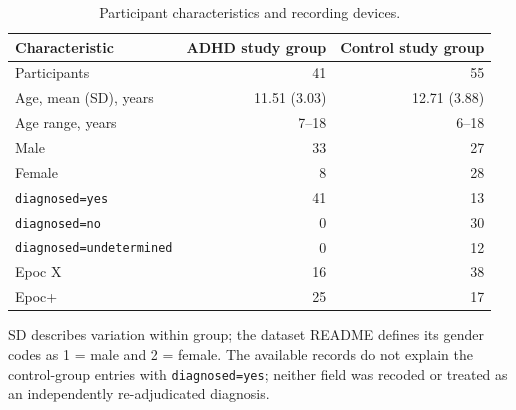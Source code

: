 \begin{table}[!htbp]
\centering\small
\caption{Participant characteristics and recording devices.}
\label{tab:participants}
\setlength{\tabcolsep}{5pt}\renewcommand{\arraystretch}{1.14}
\begin{tabularx}{\textwidth}{@{}>{\raggedright\arraybackslash}Xrr@{}}
\toprule
Characteristic & ADHD study group & Control study group\\\midrule
Participants & 41 & 55\\
Age, mean (SD), years & 11.51 (3.03) & 12.71 (3.88)\\
Age range, years & 7--18 & 6--18\\
Male & 33 & 27\\
Female & 8 & 28\\
\texttt{diagnosed=yes} & 41 & 13\\
\texttt{diagnosed=no} & 0 & 30\\
\texttt{diagnosed=undetermined} & 0 & 12\\
\midrule
Epoc X & 16 & 38\\
Epoc+ & 25 & 17\\
\bottomrule\end{tabularx}
\par\smallskip\begin{minipage}{\textwidth}\footnotesize SD describes variation within group; the dataset README defines its gender codes as 1 = male and 2 = female. The available records do not explain the control-group entries with \texttt{diagnosed=yes}; neither field was recoded or treated as an independently re-adjudicated diagnosis.\end{minipage}
\end{table}

